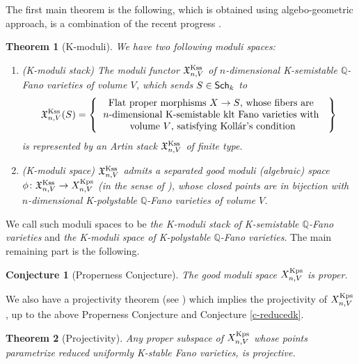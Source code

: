 \documentclass[12pt,reqno]{amsart}%
\newtheorem*{theorem*}{Theorem}
\newtheorem*{conj*}{Conjecture}
\theoremstyle{definition}
\theoremstyle{remark}
\newcommand{\Q}{{\mathbb{Q}}}
\begin{document}
The first main theorem is the following, which is obtained using algebo-geometric approach, is a combination of the recent progress \cite{Jia17, LWX18, BX19, ABHX19, Xu19, BLX19, XZ20}.
 \begin{theorem*}[K-moduli]\label{c-kmoduli} We have two following moduli spaces:
 \begin{enumerate}
\item  (K-moduli stack) The moduli functor $\mathfrak{X}^{\rm Kss}_{n,V}$ of $n$-dimensional K-semistable $\mathbb{Q}$-Fano varieties of volume $V$, which sends $S\in {\sf Sch}_k$ to
 \[
\mathfrak{X}^{\rm Kss}_{n,V}(S) = 
 \left\{
  \begin{tabular}{c}
\mbox{Flat proper morphisms $X\to S$, whose fibers are }\\
\mbox{$n$-dimensional K-semistable klt Fano varieties with  }\\
\mbox{volume $V$, satisfying Koll\'ar's condition}
  \end{tabular}
\right\}
\]
is represented by an Artin stack $\mathfrak{X}^{\rm Kss}_{n,V}$ of finite type.

\item (K-moduli space) $\mathfrak{X}^{\rm Kss}_{n,V}$ admits a separated good moduli (algebraic) space $\phi\colon \mathfrak{X}^{\rm Kss}_{n,V}\to X^{\rm Kps}_{n,V}$ (in the sense of \cite{Alp13}), whose closed points are in bijection with $n$-dimensional K-polystable $\Q$-Fano varieties of volume $V$. 
\end{enumerate}
\end{theorem*}
 
We call such moduli spaces to be {\it the K-moduli stack of K-semistable $\mathbb{Q}$-Fano varieties} and {\it the K-moduli space of K-polystable $\mathbb{Q}$-Fano varieties}.  
The main remaining part is the following.
 \begin{conj*}[Properness Conjecture]\label{c-kmoduli} 
The good moduli  space  $X^{\rm Kps}_{n,V}$ is proper.
\end{conj*}

We also have a projectivity theorem (see \cite{CP18, XZ19}) which implies the projectivity of $X^{\rm Kps}_{n,V}$, up to the above Properness Conjecture and Conjecture \ref{c-reducedk}.

\begin{theorem*}[Projectivity] Any proper subspace of $X^{\rm Kps}_{n,V}$ whose points parametrize reduced uniformly K-stable Fano varieties, is projective. 
\end{theorem*}
\end{document}
